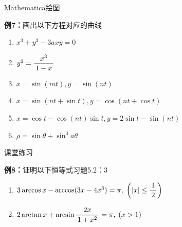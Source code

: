 \begin{frame}{Mathematica绘图}
	\linespread{1.4}
	\begin{exampleblock}{{\bf 例7：}画出以下方程对应的曲线}
		\begin{enumerate}
		  \item $x^3+y^3-3axy=0$
		  \item $y^2=\displaystyle\frac{\,{x^3}\,}{\,{1-x}\,}$
		  \item $x=\sin(mt),y=\sin(nt)$
		  \item $x=\sin(nt+\sin t),y=\cos(nt+\cos t)$
		  \item $x=\cos t-\cos(nt)\sin t,y=2\sin t-\sin(nt)$
		  \item $\rho=\sin\theta+\sin^3a\theta$
		\end{enumerate}
	\end{exampleblock}
\end{frame}

\begin{frame}{课堂练习}
	\linespread{2}
	\begin{exampleblock}{{\bf 例8：}证明以下恒等式\hfill 习题5.2：3}
		\begin{enumerate}
		  \item $3\arccos x-\arccos(3x-4x^3)=\pi,\;\left(|x|\leq\displaystyle\frac{\,{1}\,}{\,{2}\,}\right)$
		  \item $2\arctan x+\arcsin\displaystyle\frac{\,{2x}\,}{\,{1+x^2}\,}=\pi,\;(x>1)$
		\end{enumerate}
	\end{exampleblock}
\end{frame}